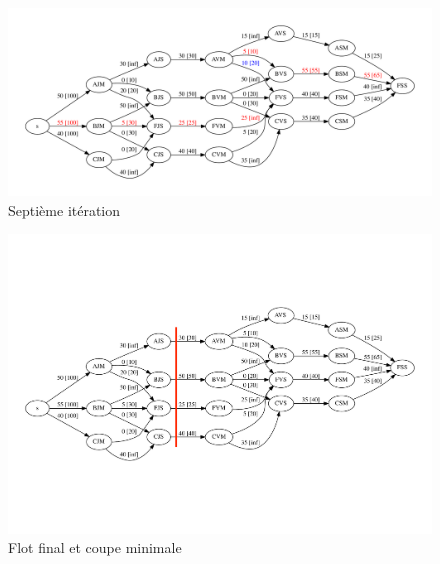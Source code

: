 \begin{figure}[h]
\begin{center}
	\includegraphics[width=\textwidth]{figs/pass-8.pdf}
	\caption{Septième itération}
	\label{fig:pass:huit}
\end{center}
\end{figure}

\begin{figure}[h]
\begin{center}
	\includegraphics[width=\textwidth]{figs/pass-9.pdf}
	\caption{Flot final et coupe minimale}
	\label{fig:pass:neuf}
\end{center}
\end{figure}

\clearpage
